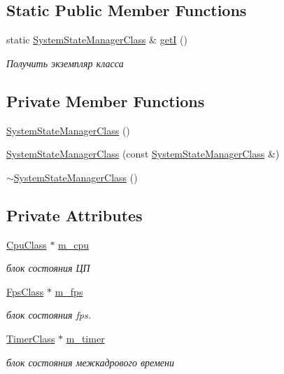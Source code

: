 \subsection*{Static Public Member Functions}
\begin{DoxyCompactItemize}
\item 
static \hyperlink{class_system_state_manager_class}{System\+State\+Manager\+Class} \& \hyperlink{class_system_state_manager_class_a9ea50fc6dfccf6fe9cbf79d00ef70b0e}{getI} ()
\begin{DoxyCompactList}\small\item\em Получить экземпляр класса \end{DoxyCompactList}\end{DoxyCompactItemize}
\subsection*{Private Member Functions}
\begin{DoxyCompactItemize}
\item 
\hyperlink{class_system_state_manager_class_a83d355c7a99ed86fa46c7fce3d054927}{System\+State\+Manager\+Class} ()
\item 
\hyperlink{class_system_state_manager_class_a879661dbbac7b5a581425f8c6de77a99}{System\+State\+Manager\+Class} (const \hyperlink{class_system_state_manager_class}{System\+State\+Manager\+Class} \&)
\item 
\hyperlink{class_system_state_manager_class_a18fcccaa9a79eaedb5ba00fc6f2564c5}{$\sim$\+System\+State\+Manager\+Class} ()
\end{DoxyCompactItemize}
\subsection*{Private Attributes}
\begin{DoxyCompactItemize}
\item 
\hyperlink{class_cpu_class}{Cpu\+Class} $\ast$ \hyperlink{class_system_state_manager_class_a2cd9a74a86368c924e66fbf587cb3e78}{m\+\_\+cpu}
\begin{DoxyCompactList}\small\item\em блок состояния ЦП \end{DoxyCompactList}\item 
\hyperlink{class_fps_class}{Fps\+Class} $\ast$ \hyperlink{class_system_state_manager_class_a025f9db3bfb88ca6b32359ed2c993b95}{m\+\_\+fps}
\begin{DoxyCompactList}\small\item\em блок состояния fps. \end{DoxyCompactList}\item 
\hyperlink{class_timer_class}{Timer\+Class} $\ast$ \hyperlink{class_system_state_manager_class_a86f7046c272727db4655c3ad3b0aa507}{m\+\_\+timer}
\begin{DoxyCompactList}\small\item\em блок состояния межкадрового времени \end{DoxyCompactList}\end{DoxyCompactItemize}
